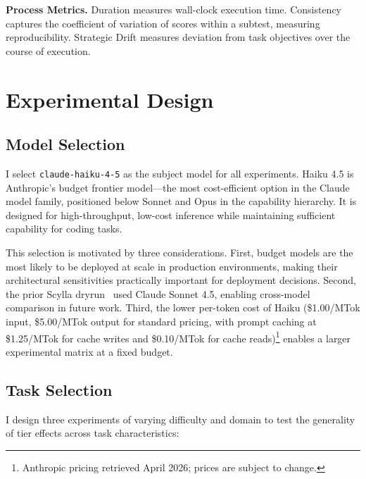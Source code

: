\documentclass[11pt]{article}
\begin{document}
\textbf{Process Metrics.} Duration measures wall-clock execution time.
Consistency captures the coefficient of variation of scores within a subtest,
measuring reproducibility. Strategic Drift measures deviation from task
objectives over the course of execution.

\section{Experimental Design}
\label{sec:experimental_design}

\subsection{Model Selection}
\label{sec:model_selection}

I select \texttt{claude-haiku-4-5} as the subject model for all experiments.
Haiku 4.5 is Anthropic's budget frontier model---the most cost-efficient
option in the Claude model family, positioned below Sonnet and Opus in the
capability hierarchy. It is designed for high-throughput, low-cost inference
while maintaining sufficient capability for coding tasks.

This selection is motivated by three considerations. First, budget models are
the most likely to be deployed at scale in production environments, making
their architectural sensitivities practically important for deployment
decisions. Second, the prior Scylla dryrun~\cite{scylla2026dryrun} used Claude
Sonnet 4.5, enabling cross-model comparison in future work. Third, the lower
per-token cost of Haiku (\$1.00/MTok input, \$5.00/MTok output for standard
pricing, with prompt caching at \$1.25/MTok for cache writes and \$0.10/MTok
for cache reads)\footnote{Anthropic pricing retrieved April 2026;
prices are subject to change.} enables a larger experimental matrix at a fixed budget.

\subsection{Task Selection}
\label{sec:task_selection}

I design three experiments of varying difficulty and domain to test the
generality of tier effects across task characteristics:
\end{document}
